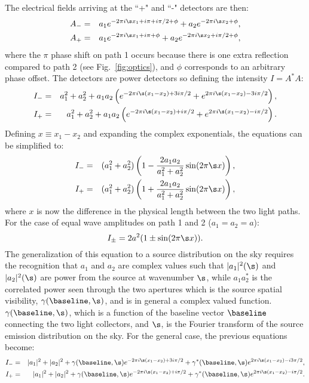 The electrical fields arriving at the ``+" and ``-" detectors are then:
\begin{eqnarray}
A_- &=& a_1 e^{-2\pi i \s x_1+ i \pi + i\pi /2+\phi} + a_2 e^{-2\pi i \s x_2 +\phi },\\
A_+ &=& a_1 e^{-2\pi i \s x_1 + i \pi +\phi} + a_2 e^{-2\pi i \s x_2 + i\pi /2 +\phi},
\end{eqnarray}
where the $\pi$ phase shift on path 1 occurs because there is one extra reflection compared to path 2 (see Fig.~\ref{fig:optics}), and $\phi$ corresponds to an arbitrary phase offset. The detectors are power detectors so defining the intensity $ I = A^* A$:
\begin{eqnarray}
I_- &=& a_1^2 + a_2^2 + a_1 a_2 \left(e^{-2\pi i \s (x_1 - x_2) + 3i\pi /2} + e^{2\pi i \s (x_1 - x_2) - 3i \pi/ 2}\right),\\
I_+ &=& a_1^2 + a_2^2 + a_1 a_2 \left(e^{-2\pi i \s (x_1 - x_2)  + i\pi /2} + e^{2\pi i \s (x_1 - x_2) -  i \pi/ 2}\right).
\end{eqnarray}
Defining $x \equiv x_1 - x_2$ and expanding the complex exponentials, the equations can be simplified to:
\begin{eqnarray}
I_- &=& (a_1^2 + a_2^2 ) \left( 1 - {2 a_1 a_2 \over a_1^2 + a_2^2} \sin( 2 \pi \s x) \right),\\
I_+ &=& (a_1^2 + a_2^2 )\left ( 1 + {2 a_1 a_2 \over a_1^2 + a_2^2} \sin( 2 \pi \s x) \right),
\end{eqnarray}
where $x$ is now the difference in the physical length between the two light paths.
For the case of equal wave amplitudes on path 1 and 2 ($a_1=a_2=a$):
\begin{equation}
I_\pm = 2 a^2 ( 1 \pm \sin( 2 \pi \s x) ).
\end{equation}
The generalization of this equation to a source distribution on the sky requires the recognition that $a_1$ and $a_2$
are complex values such that $|a_1|^2(\s)$ and $|a_2|^2(\s)$ are
power from the source at wavenumber $\s$, while $a_1 a_2^*$ is the correlated power seen through the two apertures which is
the source spatial visibility, $\gamma(\baseline,\s)$, and is in general a complex valued function. $\gamma(\baseline,\s)$, which is a function of
the baseline vector $\baseline$ connecting the two light collectors, and $\s$, is the Fourier transform of the
source emission distribution on the sky.
For the general case, the previous equations become:
\begin{eqnarray}
I_- & = & |a_1|^2 + |a_2|^2 + \gamma(\baseline,\s) e^{-2\pi i \s (x_1 - x_2) + 3i\pi /2} + \gamma^*(\baseline,\s) e^{2\pi i \s (x_1 - x_2) - i 3\pi/ 2},\\
I_+ & = & |a_1|^2 + |a_2|^2 + \gamma(\baseline,\s) e^{-2\pi i \s (x_1 - x_2) + i\pi /2} +  \gamma^*(\baseline,\s) e^{2\pi i \s (x_1 - x_2) -i  \pi/ 2}.
\end{eqnarray}
